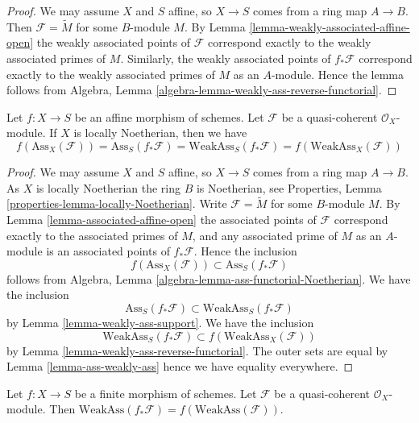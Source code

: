 \begin{proof}
We may assume $X$ and $S$ affine, so $X \to S$ comes from a ring map
$A \to B$. Then $\mathcal{F} = \widetilde M$ for some $B$-module $M$. By
Lemma \ref{lemma-weakly-associated-affine-open}
the weakly associated points of $\mathcal{F}$ correspond exactly to the
weakly associated primes of $M$. Similarly, the weakly associated points
of $f_*\mathcal{F}$ correspond exactly to the weakly associated primes
of $M$ as an $A$-module. Hence the lemma follows from
Algebra, Lemma \ref{algebra-lemma-weakly-ass-reverse-functorial}.
\end{proof}

\begin{lemma}
\label{lemma-ass-functorial-equal}
Let $f : X \to S$ be an affine morphism of schemes.
Let $\mathcal{F}$ be a quasi-coherent $\mathcal{O}_X$-module.
If $X$ is locally Noetherian, then we have
$$
f(\text{Ass}_X(\mathcal{F})) =
\text{Ass}_S(f_*\mathcal{F}) =
\text{WeakAss}_S(f_*\mathcal{F}) =
f(\text{WeakAss}_X(\mathcal{F}))
$$
\end{lemma}

\begin{proof}
We may assume $X$ and $S$ affine, so $X \to S$ comes from a ring map
$A \to B$. As $X$ is locally Noetherian the ring $B$ is Noetherian, see
Properties, Lemma \ref{properties-lemma-locally-Noetherian}.
Write $\mathcal{F} = \widetilde M$ for some $B$-module $M$. By
Lemma \ref{lemma-associated-affine-open}
the associated points of $\mathcal{F}$ correspond exactly to the associated
primes of $M$, and any associated prime of $M$ as an $A$-module is an
associated points of $f_*\mathcal{F}$.
Hence the inclusion
$$
f(\text{Ass}_X(\mathcal{F})) \subset \text{Ass}_S(f_*\mathcal{F})
$$
follows from
Algebra, Lemma \ref{algebra-lemma-ass-functorial-Noetherian}.
We have the inclusion
$$
\text{Ass}_S(f_*\mathcal{F}) \subset \text{WeakAss}_S(f_*\mathcal{F})
$$
by
Lemma \ref{lemma-weakly-ass-support}.
We have the inclusion
$$
\text{WeakAss}_S(f_*\mathcal{F}) \subset f(\text{WeakAss}_X(\mathcal{F}))
$$
by
Lemma \ref{lemma-weakly-ass-reverse-functorial}.
The outer sets are equal by
Lemma \ref{lemma-ass-weakly-ass}
hence we have equality everywhere.
\end{proof}

\begin{lemma}
\label{lemma-weakly-associated-finite}
Let $f : X \to S$ be a finite morphism of schemes.
Let $\mathcal{F}$ be a quasi-coherent $\mathcal{O}_X$-module.
Then $\text{WeakAss}(f_*\mathcal{F}) = f(\text{WeakAss}(\mathcal{F}))$.
\end{lemma}

